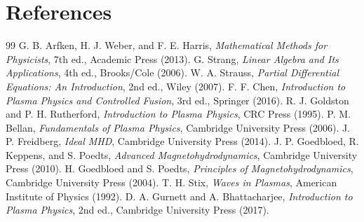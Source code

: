 \documentclass[11pt]{article}
\begin{document}
\section{References}
\begin{thebibliography}{99}
 G. B. Arfken, H. J. Weber, and F. E. Harris, \emph{Mathematical Methods for Physicists}, 7th ed., Academic Press (2013).
 G. Strang, \emph{Linear Algebra and Its Applications}, 4th ed., Brooks/Cole (2006).
 W. A. Strauss, \emph{Partial Differential Equations: An Introduction}, 2nd ed., Wiley (2007).
 F. F. Chen, \emph{Introduction to Plasma Physics and Controlled Fusion}, 3rd ed., Springer (2016).
 R. J. Goldston and P. H. Rutherford, \emph{Introduction to Plasma Physics}, CRC Press (1995).
 P. M. Bellan, \emph{Fundamentals of Plasma Physics}, Cambridge University Press (2006).
 J. P. Freidberg, \emph{Ideal MHD}, Cambridge University Press (2014).
 J. P. Goedbloed, R. Keppens, and S. Poedts, \emph{Advanced Magnetohydrodynamics}, Cambridge University Press (2010).
 H. Goedbloed and S. Poedts, \emph{Principles of Magnetohydrodynamics}, Cambridge University Press (2004).
 T. H. Stix, \emph{Waves in Plasmas}, American Institute of Physics (1992).
 D. A. Gurnett and A. Bhattacharjee, \emph{Introduction to Plasma Physics}, 2nd ed., Cambridge University Press (2017).
\end{thebibliography}
\end{document}
